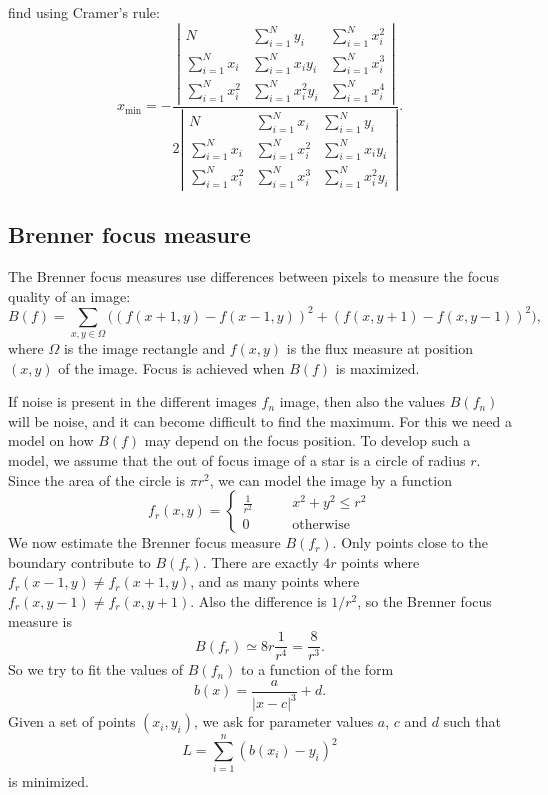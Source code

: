 find using Cramer's rule:
\[
x_{\text{min}}
=
-\frac{
\left|\begin{matrix}
           N       & \sum_{i=1}^N      y_i & \sum_{i=1}^N x_i^2 \\
\sum_{i=1}^N x_i   & \sum_{i=1}^N x_i  y_i & \sum_{i=1}^N x_i^3 \\
\sum_{i=1}^N x_i^2 & \sum_{i=1}^N x_i^2y_i & \sum_{i=1}^N x_i^4 
\end{matrix}\right|
}{
2\left|\begin{matrix}
           N       & \sum_{i=1}^N x_i   & \sum_{i=1}^N      y_i \\
\sum_{i=1}^N x_i   & \sum_{i=1}^N x_i^2 & \sum_{i=1}^N x_i  y_i \\
\sum_{i=1}^N x_i^2 & \sum_{i=1}^N x_i^3 & \sum_{i=1}^N x_i^2y_i 
\end{matrix}\right|
}.
\]

\subsection{Brenner focus measure}
The Brenner focus measures use differences between pixels to measure
the focus quality of an image:
\[
B(f)
=
\sum_{x,y\in \Omega}
\bigl((f(x+1,y)-f(x-1,y))^2
+
(f(x,y+1)-f(x,y-1))^2\bigr),
\]
where $\Omega$ is the image rectangle and $f(x,y)$ is the flux measure
at position $(x,y)$ of the image.
Focus is achieved when $B(f)$ is maximized.

If noise is present in the different images $f_n$ image, then also the
values $B(f_n)$ will be noise, and it can become difficult to find the
maximum.
For this we need a model on how $B(f)$ may depend on the focus position.
To develop such a model, we assume that the out of focus image of a star
is a circle of radius $r$. 
Since the area of the circle is $\pi r^2$, we can model the image by
a function
\[
f_r(x,y)
=
\begin{cases}
\frac1{r^2}&\qquad x^2+y^2\le r^2\\
0          &\qquad\text{otherwise}
\end{cases}
\]
We now estimate the Brenner focus measure $B(f_r)$.
Only points close to the boundary contribute to $B(f_r)$.
There are exactly $4r$ points where $f_r(x-1,y)\ne f_r(x+1,y)$, and
as many points where $f_r(x,y-1)\ne f_r(x,y+1)$.
Also the difference is $1/r^2$, so the Brenner focus measure is
\[
B(f_r)\simeq 8r \frac1{r^4}=\frac8{r^3}.
\]
So we try to fit the values of $B(f_n)$ to a function of the form
\[
b(x)=\frac{a}{|x-c|^3}+d.
\]
Given a set of points $(x_i,y_i)$, we ask for parameter values
$a$, $c$ and $d$ such that
\[
L=\sum_{i=1}^n(b(x_i)-y_i)^2
\]
is minimized.

